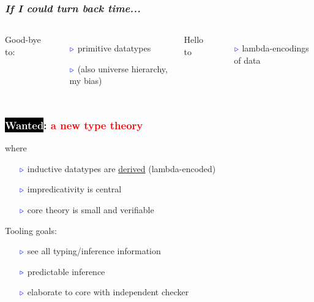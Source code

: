 \documentclass[11pt]{beamer}
\newcommand{\myb}[0]{\ensuremath{\textcolor{blue}{\triangleright}}}
\begin{document}
\begin{frame}
  \frametitle{\emph{If I could turn back time...}}

  \begin{columns}
\hspace{.5cm}    \column{2.8in}

  Good-bye to:

  \begin{itemize}
  \item[$\myb$] primitive datatypes
  \item[$\myb$] (also universe hierarchy, my bias)
  \end{itemize}

\vspace{.2cm}

  Hello to

  \begin{itemize}
  \item[$\myb$] lambda-encodings of data
  \end{itemize}

  \column{2.6in}
  \end{columns}

  \end{frame}

\begin{frame}
  \frametitle{\colorbox{black}{\textcolor{white}{Wanted}}: \textcolor{red}{a new type theory} }

  where

  \begin{itemize}
  \item[$\myb$] inductive datatypes are \underline{derived} (lambda-encoded)
  \item[$\myb$] impredicativity is central
  \item[$\myb$] core theory is small and verifiable
  \end{itemize}

\vspace{.15cm}

  Tooling goals:

  \begin{itemize}
  \item[$\myb$] see all typing/inference information 
  \item[$\myb$] predictable inference
  \item[$\myb$] elaborate to core with independent checker
  \end{itemize}

\end{frame}
\end{document}
